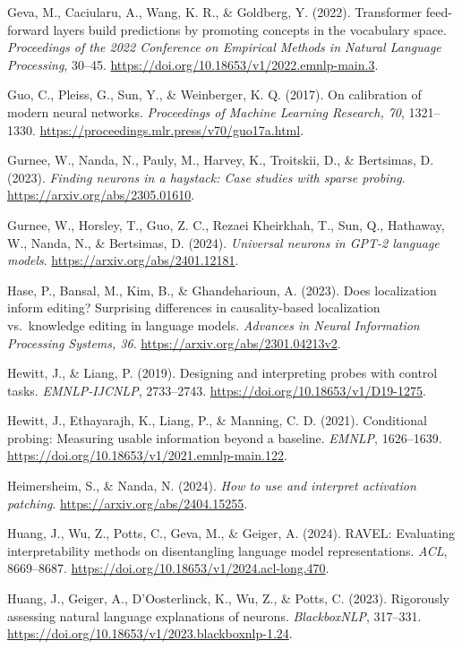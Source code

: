 \documentclass[
  british,
  11pt,
  a4paper,
]{article}
\begin{document}
Geva, M., Caciularu, A., Wang, K. R., \& Goldberg, Y. (2022).
Transformer feed-forward layers build predictions by promoting concepts
in the vocabulary space. \emph{Proceedings of the 2022 Conference on
Empirical Methods in Natural Language Processing}, 30--45.
\url{https://doi.org/10.18653/v1/2022.emnlp-main.3}.

Guo, C., Pleiss, G., Sun, Y., \& Weinberger, K. Q. (2017). On
calibration of modern neural networks. \emph{Proceedings of Machine
Learning Research, 70}, 1321--1330.
\url{https://proceedings.mlr.press/v70/guo17a.html}.

Gurnee, W., Nanda, N., Pauly, M., Harvey, K., Troitskii, D., \&
Bertsimas, D. (2023). \emph{Finding neurons in a haystack: Case studies
with sparse probing}. \url{https://arxiv.org/abs/2305.01610}.

Gurnee, W., Horsley, T., Guo, Z. C., Rezaei Kheirkhah, T., Sun, Q.,
Hathaway, W., Nanda, N., \& Bertsimas, D. (2024). \emph{Universal
neurons in GPT-2 language models}.
\url{https://arxiv.org/abs/2401.12181}.

Hase, P., Bansal, M., Kim, B., \& Ghandeharioun, A. (2023). Does
localization inform editing? Surprising differences in causality-based
localization vs.~knowledge editing in language models. \emph{Advances in
Neural Information Processing Systems, 36}.
\url{https://arxiv.org/abs/2301.04213v2}.

Hewitt, J., \& Liang, P. (2019). Designing and interpreting probes with
control tasks. \emph{EMNLP-IJCNLP}, 2733--2743.
\url{https://doi.org/10.18653/v1/D19-1275}.

Hewitt, J., Ethayarajh, K., Liang, P., \& Manning, C. D. (2021).
Conditional probing: Measuring usable information beyond a baseline.
\emph{EMNLP}, 1626--1639.
\url{https://doi.org/10.18653/v1/2021.emnlp-main.122}.

Heimersheim, S., \& Nanda, N. (2024). \emph{How to use and interpret
activation patching}. \url{https://arxiv.org/abs/2404.15255}.

Huang, J., Wu, Z., Potts, C., Geva, M., \& Geiger, A. (2024). RAVEL:
Evaluating interpretability methods on disentangling language model
representations. \emph{ACL}, 8669--8687.
\url{https://doi.org/10.18653/v1/2024.acl-long.470}.

Huang, J., Geiger, A., D'Oosterlinck, K., Wu, Z., \& Potts, C. (2023).
Rigorously assessing natural language explanations of neurons.
\emph{BlackboxNLP}, 317--331.
\url{https://doi.org/10.18653/v1/2023.blackboxnlp-1.24}.
\end{document}
